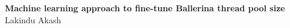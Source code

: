 \begin{titlepage}
   \begin{center}

        \textbf{\Huge Machine learning approach to fine-tune Ballerina thread pool size}
        \vfill
        \LARGE{Lakindu Akash}

   \end{center}
\end{titlepage}